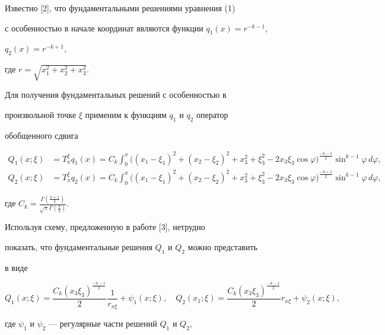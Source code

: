  


Известно [2], что фундаментальными решениями уравнения (1) 


с особенностью в начале координат являются функции $q_1(x)=r^{-k-1}$, 


$q_2(x)=r^{-k+1}$, 


где $r=\sqrt{x^2_1+x^2_2+x^2_3}$. 


 


Для получения фундаментальных решений с особенностью в 


произвольной точке $\xi$ применим к функциям $q_1$ и $q_2$ оператор 


обобщенного сдвига 


\begin{align*} 


Q_1(x;\xi)&= T^\xi_x q_1(x)=C_k\int^\pi_0 


\big((x_1-\xi_1)^2+(x_2-\xi_2)^2+x^2_3+\xi^2_3- 


2x_3\xi_3\cos\varphi\big)^{\frac{-k-1}{2}}\sin^{k-1} 


\varphi\,d\varphi,\\ 


% 


Q_2(x;\xi)&= T^\xi_x q_2(x)= C_k\int^\pi_0\big((x_1-\xi_1)^2+ 


(x_2-\xi_2)^2+x^2_3+\xi^2_3-2x_3\xi_3\cos\varphi 


\big)^{\frac{-k+1}{2}}\sin^{k-1}\varphi\,d\varphi, 


\end{align*} 


где $C_k=\frac{\Gamma(\frac{k+1}{2})} 


{\sqrt{\pi}\Gamma(\frac{k}{2})}$. 


Используя схему, предложенную в работе [3], нетрудно 


показать, что фундаментальные решения $Q_1$ и $Q_2$ можно представить 


в виде 


$$ 


Q_1(x;\xi)=\frac{C_k(x_3\xi_3)^{\frac{-k-1}{2}}}{2} 


\frac{1}{r_{x\xi}}+\psi_1(x;\xi),\quad 


Q_2(x_1;\xi)=\frac{C_k(x_3\xi_3)^{\frac{-k-1}{2}}}{2} 


r_{x\xi}+\psi_2(x;\xi),


$$ 


где $\psi_1$ и $\psi_2$ --- регулярные части решений $Q_1$ и $Q_2$, 


